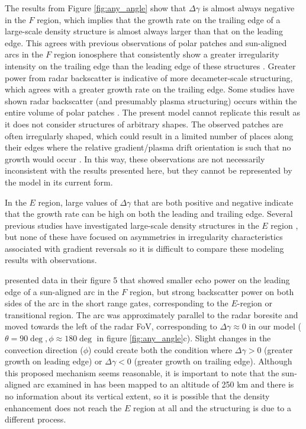 The results from Figure \ref{fig:any_angle} show that \(\Delta\gamma\) is almost always negative in the \(F\) region, which implies that the growth rate on the trailing edge of a large-scale density structure is almost always larger than that on the leading edge.  This agrees with previous observations of polar patches and sun-aligned arcs in the \(F\) region ionosphere that consistently show a greater irregularity intensity on the trailing edge than the leading edge of these structures \citep{Weber1984,Milan2002a,Koustov2012}.  Greater power from radar backscatter is indicative of more decameter-scale structuring, which agrees with a greater growth rate on the trailing edge.  Some studies have shown radar backscatter (and presumably plasma structuring) occurs within the entire volume of polar patches \citep{Hosokawa2009}.  The present model cannot replicate this result as it does not consider structures of arbitrary shapes.  The observed patches are often irregularly shaped, which could result in a limited number of places along their edges where the relative gradient/plasma drift orientation is such that no growth would occur \citep{Hosokawa2009}.  In this way, these observations are not necessarily inconsistent with the results presented here, but they cannot be represented by the model in its current form.

In the \(E\) region, large values of \(\Delta\gamma\) that are both positive and negative indicate that the growth rate can be high on both the leading and trailing edge.  Several previous studies have investigated large-scale density structures in the \(E\) region \citep{Milan1999b,Milan2001a,Milan2002a}, but none of these have focused on asymmetries in irregularity characteristics associated with gradient reversals so it is difficult to compare these modeling results with observations.  

\citet{Koustov2008} presented data in their figure 5 that showed smaller echo power on the leading edge of a sun-aligned arc in the \(F\) region, but strong backscatter power on both sides of the arc in the short range gates, corresponding to the \(E\)-region or transitional region.  The arc was approximately parallel to the radar boresite and moved towards the left of the radar FoV, corresponding to \(\Delta\gamma\approx 0\) in our model (\(\theta=90\deg,\phi\approx 180\deg\) in figure \ref{fig:any_angle}c).  Slight changes in the convection direction (\(\phi\)) could create both the condition where \(\Delta\gamma>0\) (greater growth on leading edge) or \(\Delta\gamma<0\) (greater growth on trailing edge).  Although this proposed mechanism seems reasonable, it is important to note that the sun-aligned arc examined in \citet{Koustov2008} has been mapped to an altitude of 250 km and there is no information about its vertical extent, so it is possible that the density enhancement does not reach the \(E\) region at all and the structuring is due to a different process.


